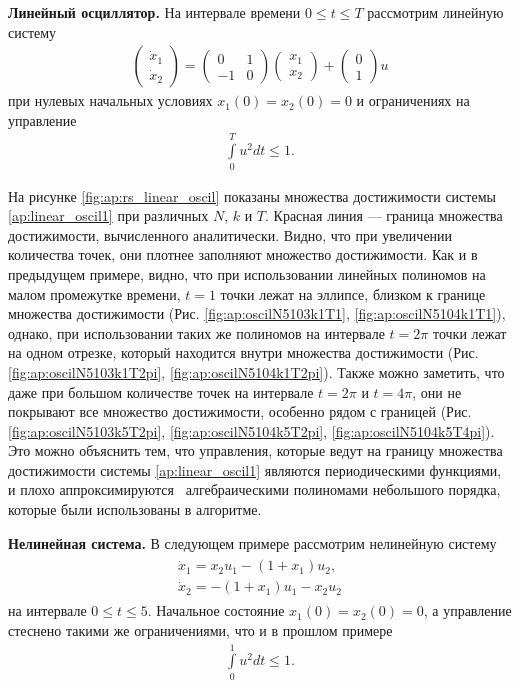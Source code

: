 \documentclass[../main.tex]{subfiles}
\begin{document}
 \textbf{Линейный осциллятор.} На интервале времени $ 0 \leqslant t \leqslant T$ рассмотрим линейную систему 
 \begin{gather}\label{ap:linear_oscil1}
 	\begin{pmatrix} 
 		\dot{x}_1 \\
 		\dot{x}_2 
 	\end{pmatrix} = 
 	\begin{pmatrix}
 		0 & 1 \\
 		-1 & 0
 	\end{pmatrix}
 	\begin{pmatrix} 
 		x_1 \\
 		x_2 
 	\end{pmatrix} +
 	\begin{pmatrix} 0 \\ 1
 	\end{pmatrix} u
 \end{gather}
 при нулевых начальных условиях $x_1(0) = x_2(0) = 0 $ и ограничениях на управление 
 \begin{gather*}
 	\int\limits_0^T u^2dt \leqslant 1.
 \end{gather*}
 
 На рисунке \ref{fig:ap:rs_linear_oscil} показаны множества достижимости системы \eqref{ap:linear_oscil1} при различных $N$, $k$ и $T$.
 Красная линия --- граница множества достижимости, вычисленного аналитически.
 Видно, что при увеличении количества точек, они плотнее заполняют множество достижимости.
 Как и в предыдущем примере, видно, что при использовании линейных полиномов на малом промежутке времени, $t = 1$ точки лежат на эллипсе, близком к границе множества достижимости (Рис. \ref{fig:ap:oscilN5103k1T1}, \ref{fig:ap:oscilN5104k1T1}), однако, при использовании таких же полиномов на интервале $t = 2\pi$ точки лежат на одном отрезке, который находится внутри множества достижимости (Рис. \ref{fig:ap:oscilN5103k1T2pi}, \ref{fig:ap:oscilN5104k1T2pi}). 
 Также можно заметить, что даже при большом количестве точек на интервале $t = 2\pi$ и $t = 4\pi$, они не покрывают все множество достижимости, особенно рядом с границей (Рис. \ref{fig:ap:oscilN5103k5T2pi}, \ref{fig:ap:oscilN5104k5T2pi}, \ref{fig:ap:oscilN5104k5T4pi}). 
 Это можно объяснить тем, что управления, которые ведут на границу множества достижимости системы \eqref{ap:linear_oscil1} являются периодическими функциями, и плохо аппроксимируются  алгебраическими полиномами небольшого порядка, которые были использованы в алгоритме.
 
 \textbf{Нелинейная система.} В следующем примере рассмотрим нелинейную систему 
 \begin{gather}\label{ap:nonlinear_system1}
 	\begin{gathered}
 	\dot{x}_1 = x_2 u_1 - (1 + x_1) u_2,\\
 	\dot{x}_2 = -(1 + x_1) u_1 - x_2 u_2
 	\end{gathered}
 \end{gather}
 на интервале $ 0 \leqslant t \leqslant 5$.
 Начальное состояние $x_1(0) = x_2(0) = 0 $, а управление стеснено такими же ограничениями, что и в прошлом примере
 \begin{gather*}
 	\int\limits_0^1 u^2dt \leqslant 1.
 \end{gather*}
 
\end{document}
